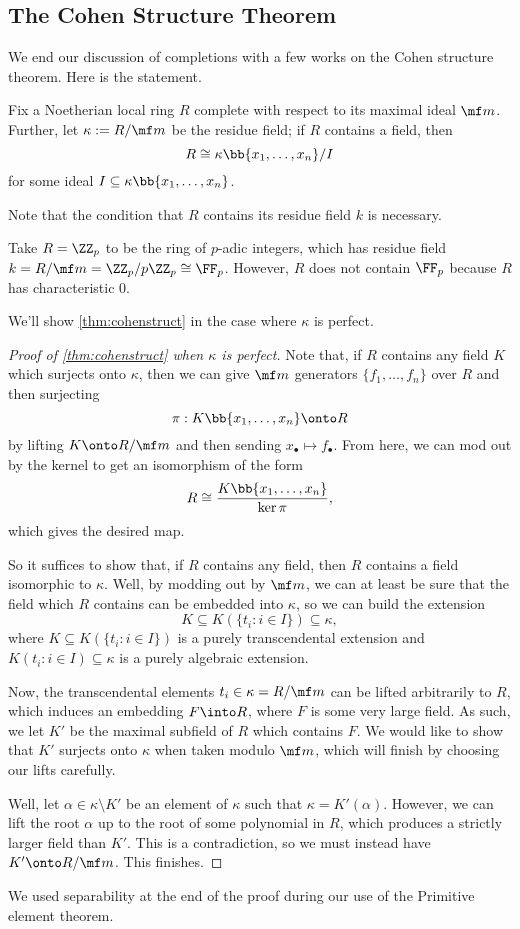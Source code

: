 \subsection{The Cohen Structure Theorem}
We end our discussion of completions with a few works on the Cohen structure theorem. Here is the statement.
\begin{theorem} \label{thm:cohenstruct}
	Fix a Noetherian local ring $R$ complete with respect to its maximal ideal $\mf m$. Further, let $\kappa:=R/\mf m$ be the residue field; if $R$ contains a field, then
	\[R\cong\kappa\bb{x_1,\ldots,x_n}/I\]
	for some ideal $I\subseteq\kappa\bb{x_1,\ldots,x_n}$.
\end{theorem}
Note that the condition that $R$ contains its residue field $k$ is necessary.
\begin{nex}
	Take $R=\ZZ_p$ to be the ring of $p$-adic integers, which has residue field $k=R/\mf m=\ZZ_p/p\ZZ_p\cong\FF_p$. However, $R$ does not contain $\FF_p$ because $R$ has characteristic $0$.
\end{nex}
We'll show \autoref{thm:cohenstruct} in the case where $\kappa$ is perfect.
\begin{proof}[Proof of \autoref{thm:cohenstruct} when $\kappa$ is perfect]
	Note that, if $R$ contains any field $K$ which surjects onto $\kappa$, then we can give $\mf m$ generators $\{f_1,\ldots,f_n\}$ over $R$ and then surjecting
	\[\pi:K\bb{x_1,\ldots,x_n}\onto R\]
	by lifting $K\onto R/\mf m$ and then sending $x_\bullet\mapsto f_\bullet$. %
	From here, we can mod out by the kernel to get an isomorphism of the form
	\[R\cong\frac{K\bb{x_1,\ldots,x_n}}{\ker\pi},\]
	which gives the desired map.

	So it suffices to show that, if $R$ contains any field, then $R$ contains a field isomorphic to $\kappa$. Well, by modding out by $\mf m$, we can at least be sure that the field which $R$ contains can be embedded into $\kappa$, so we can build the extension
	\[K\subseteq K(\{t_i:i\in I\})\subseteq\kappa,\]
	where $K\subseteq K(\{t_i:i\in I\})$ is a purely transcendental extension and $K(t_i:i\in I)\subseteq\kappa$ is a purely algebraic extension.

	Now, the transcendental elements $t_i\in\kappa=R/\mf m$ can be lifted arbitrarily to $R$, which induces an embedding $F\into R$, where $F$ is some very large field. As such, we let $K'$ be the maximal subfield of $R$ which contains $F$. We would like to show that $K'$ surjects onto $\kappa$ when taken modulo $\mf m$, which will finish by choosing our lifts carefully.

	Well, let $\alpha\in\kappa\setminus K'$ be an element of $\kappa$ such that $\kappa=K'(\alpha)$. However, we can lift the root $\alpha$ up to the root of some polynomial in $R$, which produces a strictly larger field than $K'$. This is a contradiction, so we must instead have $K'\onto R/\mf m$. This finishes.
\end{proof}
\begin{remark}
	We used separability at the end of the proof during our use of the Primitive element theorem.
\end{remark}